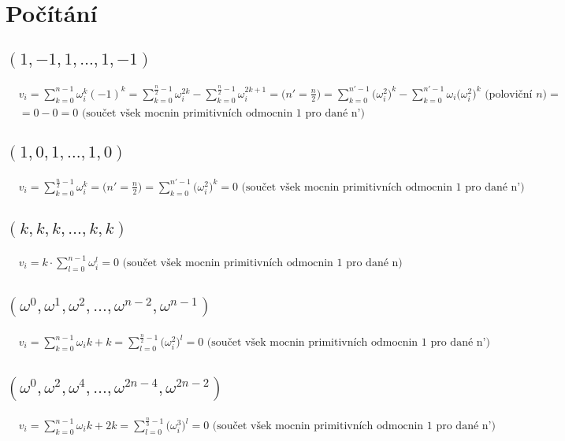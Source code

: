 \documentclass[a4paper]{article}
\begin{document}
\renewcommand{\headrulewidth}{0pt} %
\thispagestyle{fancy} %
{}

\section*{Počítání}
\subsection*{$(1,-1,1,\ldots,1,-1)$}
\begin{align*}
	& v_i = \sum_{k=0}^{n-1} \omega_i^k (-1)^k = \sum_{k=0}^{\frac{n}{2}-1} \omega_i^{2k} - \sum_{k=0}^{\frac{n}{2}-1} \omega_i^{2k+1} = \big(n' = \frac{n}{2}\big) = \sum_{k=0}^{n'-1} \big(\omega_i^{2}\big)^k - \sum_{k=0}^{n'-1} \omega_i \big(\omega_i^{2}\big)^k \text{ (poloviční $n$)} = \\
	& = 0 - 0 = 0 \text{ (součet všek mocnin primitivních odmocnin 1 pro dané n')}
\end{align*}
\subsection*{$(1,0,1,\ldots,1,0)$}
\begin{align*}
	& v_i = \sum_{k=0}^{\frac{n}{2}-1} \omega_i^{k} = \big(n' = \frac{n}{2}\big) = \sum_{k=0}^{n'-1} \big(\omega_i^{2}\big)^k = 0 \text{ (součet všek mocnin primitivních odmocnin 1 pro dané n')}
\end{align*}
\subsection*{$(k,k,k,\ldots,k,k)$}
\begin{align*}
	& v_i = k \cdot \sum_{l=0}^{n-1} \omega_i^{l} = 0 \text{ (součet všek mocnin primitivních odmocnin 1 pro dané n)}
\end{align*}
\subsection*{$(\omega^0,\omega^1, \omega^2,\ldots,\omega^{n-2},\omega^{n-1})$}
\begin{align*}
	& v_i = \sum_{k=0}^{n-1} \omega_i{k+k} = \sum_{l=0}^{\frac{n}{2}-1} \big(\omega_i^{2}\big)^l = 0 \text{ (součet všek mocnin primitivních odmocnin 1 pro dané n')}
\end{align*}
\subsection*{$(\omega^0,\omega^2, \omega^4,\ldots,\omega^{2n-4},\omega^{2n-2})$}
\begin{align*}
	& v_i = \sum_{k=0}^{n-1} \omega_i{k+2k} = \sum_{l=0}^{\frac{n}{3}-1} \big(\omega_i^{3}\big)^l = 0 \text{ (součet všek mocnin primitivních odmocnin 1 pro dané n')}
\end{align*}
\end{document}
